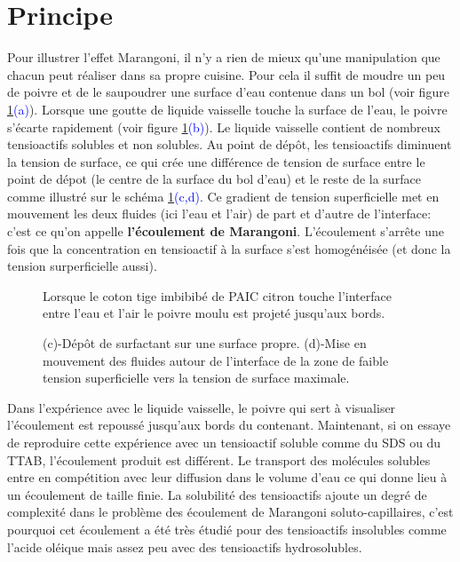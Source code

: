 \section{Principe}

Pour illustrer l'effet Marangoni, il n'y a rien de mieux qu'une manipulation que chacun peut réaliser dans sa propre cuisine. Pour cela il suffit de moudre un peu de poivre et de le saupoudrer une surface d'eau contenue dans un bol (voir figure \ref{fig:Distanciation}\textcolor{blue}{(a)}). Lorsque une goutte de liquide vaisselle touche la surface de l'eau, le poivre s'écarte rapidement (voir figure \ref{fig:Distanciation}\textcolor{blue}{(b)}). Le liquide vaisselle contient de nombreux tensioactifs solubles et non solubles. Au point de dépôt, les tensioactifs diminuent la tension de surface, ce qui crée une différence de tension de surface entre le point de dépot (le centre de la surface du bol d'eau) et le reste de la surface comme illustré sur le schéma \ref{fig:Distanciation}\textcolor{blue}{(c,d)}. Ce gradient de tension superficielle met en mouvement les deux fluides (ici l'eau et l'air) de part et d'autre de l'interface: c'est ce qu'on appelle \textbf{l'écoulement de Marangoni}. L'écoulement s'arrête une fois que la concentration en tensioactif à la surface s'est homogénéisée (et donc la tension surperficielle aussi).
\begin{figure}[!ht]
  \centering
  \resizebox{.9\textwidth}{!}{}
  \caption{Lorsque le coton tige imbibibé de PAIC citron touche l'interface entre l'eau et l'air le poivre moulu est projeté jusqu'aux bords.}
  \label{fig:Distanciation}
\end{figure}

\begin{figure}[!ht]
  \resizebox{1\textwidth}{!}{}
  \caption{(c)-Dépôt de surfactant sur une surface propre. (d)-Mise en mouvement des fluides autour de l'interface de la zone de faible tension superficielle vers la tension de surface maximale.}
  \label{fig:SketchPrincipe}
\end{figure}
Dans l'expérience avec le liquide vaisselle, le poivre qui sert à visualiser l'écoulement est repoussé jusqu'aux bords du contenant. Maintenant, si on essaye de reproduire cette expérience avec un tensioactif soluble comme du SDS ou du TTAB, l'écoulement produit est différent. Le transport des molécules solubles entre en compétition avec leur diffusion dans le volume d'eau ce qui donne lieu à un écoulement de taille finie. La solubilité des tensioactifs ajoute un degré de complexité dans le problème des écoulement de Marangoni soluto-capillaires, c'est pourquoi cet écoulement a été très étudié pour des tensioactifs insolubles comme l'acide oléique mais assez peu avec des tensioactifs hydrosolubles.

